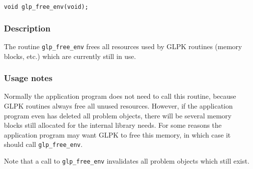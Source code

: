 \begin{verbatim}
void glp_free_env(void);
\end{verbatim}

\subsubsection*{Description}

The routine \verb|glp_free_env| frees all resources used by GLPK
routines (memory blocks, etc.) which are currently still in use.

\subsubsection*{Usage notes}

Normally the application program does not need to call this routine,
because GLPK routines always free all unused resources. However, if
the application program even has deleted all problem objects, there
will be several memory blocks still allocated for the internal library
needs. For some reasons the application program may want GLPK to free
this memory, in which case it should call \verb|glp_free_env|.

Note that a call to \verb|glp_free_env| invalidates all problem objects
which still exist.

